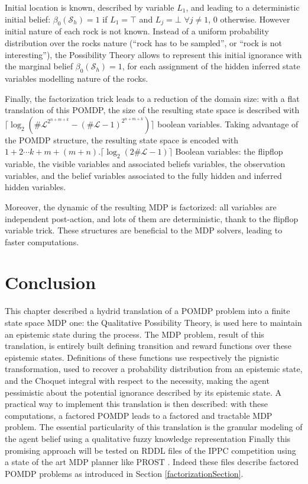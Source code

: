 Initial location is known, described by variable $L_1$, and leading to a deterministic initial belief: 
$\beta_0(\mathcal{S}_h) = 1$ if $L_1=\top$ and $L_j = \bot$ $\forall j \neq 1$, $0$ otherwise. However
initial nature of each rock is not known. Instead of a uniform probability distribution over the
rocks nature (``rock has to be sampled'', or ``rock is not interesting''), the Possibility Theory allows to represent this initial ignorance with the
marginal belief $\beta_0(\mathcal{S}_h) = 1$, for each assignment of the hidden inferred state variables
modelling nature of the rocks. 

Finally, the factorization trick leads to a reduction of the domain size: 
with a flat translation of this POMDP, the size of the resulting state space is described with
$\lceil \log_2( \# \mathcal{L}^{2^{n+m+k}} - (\# \mathcal{L}-1)^{2^{n+m+k}}) \rceil$ boolean variables.
Taking advantage of the POMDP structure, the resulting state space is encoded with 
$1+2 \cdots k+m+(m+n).\lceil \log_2(2 \# \mathcal{L} -1 )  \rceil$ Boolean variables:
the flipflop variable, the visible variables and associated beliefs variables, 
the observation variables, and the belief variables 
associated to the fully hidden and inferred hidden variables.

Moreover, the dynamic of the resulting MDP is factorized: all variables are independent post-action,
and lots of them are deterministic, thank to the flipflop variable trick.
These structures are beneficial to the MDP solvers,
leading to faster computations.

\section{Conclusion}
This chapter described a hydrid translation 
of a POMDP problem into a finite state space MDP one:  
the Qualitative Possibility Theory, 
is used here to maintain an epistemic state during the process. 
The MDP problem, result of this translation, 
is entirely built defining transition and reward functions
over these epistemic states. 
Definitions of these functions use respectively the pignistic transformation,
used to recover a probability distribution 
from an epistemic state, 
and the Choquet integral with respect to the necessity, 
making the agent pessimistic about the potential ignorance 
described by its epistemic state.
A practical way to implement this translation 
is then described: 
with these computations, 
a factored POMDP leads to a factored and tractable MDP problem. 
The essential particularity of this translation 
is the granular modeling of the agent belief 
using a qualitative fuzzy knowledge representation 
Finally this promising approach will be tested on RDDL files 
of the IPPC competition \cite{SannerIPPC1111}
using a state of the art MDP planner like PROST 
\cite{DBLP:conf/aips/KellerE12}. Indeed these files describe
factored POMDP problems as introduced in Section \ref{factorizationSection}.
